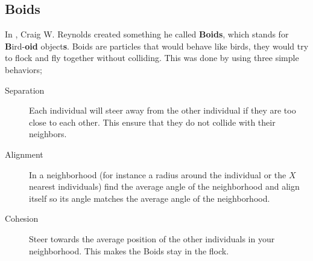\subsection{Boids}
In \citep{Reynolds1999}, Craig W. Reynolds created something he called \textbf{Boids}, which stands for \textbf{B}ird-\textbf{oid} object\textbf{s}. Boids are particles that would behave like birds, they would try to flock and fly together without colliding. This was done by using three simple behaviors;
\begin{description}
    \item[Separation]
        Each individual will steer away from the other individual if they are too close to each other. This ensure that they do not collide with their neighbors.
    \item[Alignment]
        In a neighborhood (for instance a radius around the individual or the $X$ nearest individuals) find the average angle of the neighborhood and align itself so its angle matches the average angle of the neighborhood.
    \item[Cohesion]
        Steer towards the average position of the other individuals in your neighborhood. This makes the Boids stay in the flock.
\end{description}

